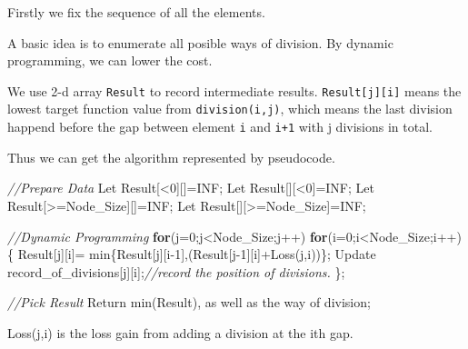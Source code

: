 \documentclass[]{article}
\newenvironment{Shaded}{}{}
\newcommand{\CommentTok}[1]{\textcolor[rgb]{0.38,0.63,0.69}{\textit{#1}}}
\newcommand{\ControlFlowTok}[1]{\textcolor[rgb]{0.00,0.44,0.13}{\textbf{#1}}}
\newcommand{\DecValTok}[1]{\textcolor[rgb]{0.25,0.63,0.44}{#1}}
\newcommand{\NormalTok}[1]{#1}
\begin{document}
Firstly we fix the sequence of all the elements.

A basic idea is to enumerate all posible ways of division. By dynamic
programming, we can lower the cost.

We use 2-d array \texttt{Result} to record intermediate results.
\texttt{Result{[}j{]}{[}i{]}} means the lowest target function value
from \texttt{division(i,j)}, which means the last division happend
before the gap between element \texttt{i} and \texttt{i+1} with j
divisions in total.

Thus we can get the algorithm represented by pseudocode.

\begin{Shaded}
\begin{Highlighting}[]
\CommentTok{//Prepare Data}
\NormalTok{Let Result[<}\DecValTok{0}\NormalTok{][]=INF;}
\NormalTok{Let Result[][<}\DecValTok{0}\NormalTok{]=INF;}
\NormalTok{Let Result[>=Node_Size][]=INF;}
\NormalTok{Let Result[][>=Node_Size]=INF;}

\CommentTok{//Dynamic Programming}
\ControlFlowTok{for}\NormalTok{(j=}\DecValTok{0}\NormalTok{;j<Node_Size;j++)}
    \ControlFlowTok{for}\NormalTok{(i=}\DecValTok{0}\NormalTok{;i<Node_Size;i++)}
\NormalTok{    \{}
\NormalTok{        Result[j][i]=}
\NormalTok{            min\{Result[j][i}\DecValTok{-1}\NormalTok{],(Result[j}\DecValTok{-1}\NormalTok{][i]+Loss(j,i))\};}
\NormalTok{        Update record_of_divisions[j][i];}\CommentTok{//record the position of divisions.}
\NormalTok{    \};}

\CommentTok{//Pick Result}
\NormalTok{Return min(Result), as well as the way of division;}
\end{Highlighting}
\end{Shaded}

Loss(j,i) is the loss gain from adding a division at the ith gap.
\end{document}

